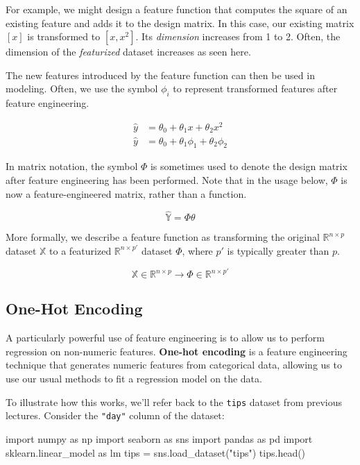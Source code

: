 \documentclass[
  letterpaper,
  DIV=11,
  numbers=noendperiod]{scrreprt}
\newenvironment{Shaded}{\begin{snugshade}}{\end{snugshade}}
\newcommand{\ImportTok}[1]{\textcolor[rgb]{0.00,0.46,0.62}{#1}}
\newcommand{\NormalTok}[1]{\textcolor[rgb]{0.00,0.23,0.31}{#1}}
\newcommand{\OperatorTok}[1]{\textcolor[rgb]{0.37,0.37,0.37}{#1}}
\newcommand{\StringTok}[1]{\textcolor[rgb]{0.13,0.47,0.30}{#1}}
\begin{document}
For example, we might design a feature function that computes the square
of an existing feature and adds it to the design matrix. In this case,
our existing matrix \([x]\) is transformed to \([x, x^2]\). Its
\emph{dimension} increases from 1 to 2. Often, the dimension of the
\emph{featurized} dataset increases as seen here.

The new features introduced by the feature function can then be used in
modeling. Often, we use the symbol \(\phi_i\) to represent transformed
features after feature engineering.

\[
\begin{align}
\hat{y} &= \theta_0 + \theta_1 x + \theta_2 x^2 \\
\hat{y} &= \theta_0 + \theta_1 \phi_1 + \theta_2 \phi_2
\end{align}
\]

In matrix notation, the symbol \(\Phi\) is sometimes used to denote the
design matrix after feature engineering has been performed. Note that in
the usage below, \(\Phi\) is now a feature-engineered matrix, rather
than a function.

\[\hat{\mathbb{Y}} = \Phi \theta\]

More formally, we describe a feature function as transforming the
original \(\mathbb{R}^{n \times p}\) dataset \(\mathbb{X}\) to a
featurized \(\mathbb{R}^{n \times p'}\) dataset \(\mathbb{\Phi}\), where
\(p'\) is typically greater than \(p\).

\[\mathbb{X} \in \mathbb{R}^{n \times p} \longrightarrow \Phi \in \mathbb{R}^{n \times p'}\]

\subsection{One-Hot Encoding}\label{one-hot-encoding}

A particularly powerful use of feature engineering is to allow us to
perform regression on non-numeric features. \textbf{One-hot encoding} is
a feature engineering technique that generates numeric features from
categorical data, allowing us to use our usual methods to fit a
regression model on the data.

To illustrate how this works, we'll refer back to the \texttt{tips}
dataset from previous lectures. Consider the \texttt{"day"} column of
the dataset:

\begin{Shaded}
\begin{Highlighting}[]
\ImportTok{import}\NormalTok{ numpy }\ImportTok{as}\NormalTok{ np}
\ImportTok{import}\NormalTok{ seaborn }\ImportTok{as}\NormalTok{ sns}
\ImportTok{import}\NormalTok{ pandas }\ImportTok{as}\NormalTok{ pd}
\ImportTok{import}\NormalTok{ sklearn.linear\_model }\ImportTok{as}\NormalTok{ lm}
\NormalTok{tips }\OperatorTok{=}\NormalTok{ sns.load\_dataset(}\StringTok{"tips"}\NormalTok{)}
\NormalTok{tips.head()}
\end{Highlighting}
\end{Shaded}
\end{document}
